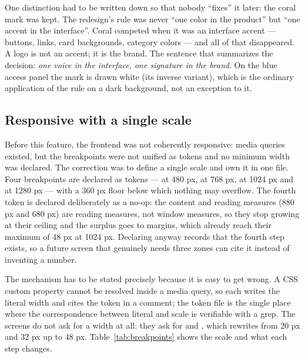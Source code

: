 One distinction had to be written down so that nobody \enquote{fixes} it later: the coral mark was
kept. The redesign's rule was never \enquote{one color in the product} but \enquote{one accent in
the interface}. Coral competed when it was an interface accent — buttons, links, card backgrounds,
category colors — and all of that disappeared. A logo is not an accent; it is the brand. The
sentence that summarizes the decision: \emph{one voice in the interface, one signature in the
brand}. On the blue access panel the mark is drawn white (its inverse variant), which is the
ordinary application of the rule on a dark background, not an exception to it.

\subsection{Responsive with a single scale}

Before this feature, the frontend was not coherently responsive: media queries existed, but the
breakpoints were not unified as tokens and no minimum width was declared. The correction was to
define a single scale and own it in one file. Four breakpoints are declared as tokens —
 at 480 px,  at 768 px,  at 1024 px and 
at 1280 px — with a 360 px floor below which nothing may overflow. The fourth token is declared
deliberately as a no-op: the content and reading measures (880 px and 680 px) are reading measures,
not window measures, so they stop growing at their ceiling and the surplus goes to margins, which
already reach their maximum of 48 px at 1024 px. Declaring  anyway records that the
fourth step exists, so a future screen that genuinely needs three zones can cite it instead of
inventing a number.

The mechanism has to be stated precisely because it is easy to get wrong. A CSS custom property
cannot be resolved inside a media query, so each  writes the literal width and cites
the token in a comment; the token file is the single place where the correspondence between literal
and scale is verifiable with a grep. The screens do not ask for a width at all: they ask for
 and , which  rewrites from 20 px
and 32 px up to 48 px. Table~\ref{tab:breakpoints} shows the scale and what each step changes.

